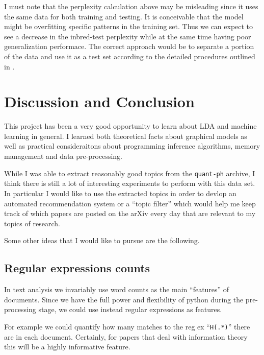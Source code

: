 \documentclass[11pt]{article}
\begin{document}
        I must note that the perplexity calculation above may be misleading since
        it uses the same data for both training and testing. 
        It is conceivable that the model might be overfitting specific patterns in the training
        set.
        Thus we can expect to see a decrease in the inbred-test perplexity while at the 
        same time having poor generalization performace.
        The correct approach would be to separate a portion of the data and use it as a test set
        according to the detailed procedures outlined in \cite{heinrich2005parameter}.
        


	
	
\section{Discussion and Conclusion}

    This project has been a very good opportunity to learn about LDA and machine learning in
    general.
    I learned both theoretical facts about graphical models as well as practical consideraitons
    about programming inference algorithms, memory management and data pre-processing.

    While I was able to extract reasonably good topics from the \texttt{quant-ph} archive,
    I think there is still a lot of interesting experiments to perform with this data set.
    In particular I would like to use the extracted topics in order to devlop an automated
    recommendation system or a ``topic filter'' which would help me keep track of which papers
    are posted on the arXiv every day that are relevant to my topics of research.

    Some other ideas that I would like to pursue are the following.

	\subsection{Regular expressions counts}
        
        In text analysis we invariably use word counts as the main ``features'' of documents.
        Since we have the full power and flexibility of python during the pre-processing stage,
        we could use instead regular expressions as features.

        For example we could quantify how many matches to the reg ex ``\texttt{H(.*)}'' there are
        in each document. Certainly, for papers that deal with information theory this will be 
        a highly informative feature.
\end{document}
